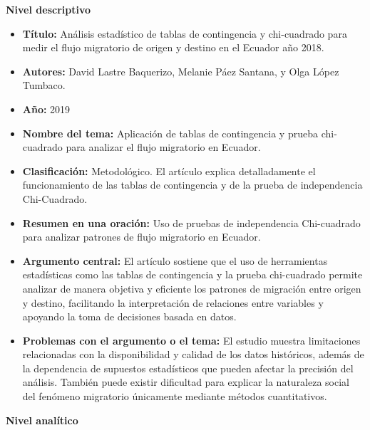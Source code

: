 \documentclass[12pt]{article}
\begin{document}
\textbf{Nivel descriptivo}
\begin{itemize}
    \item \textbf{Título:} Análisis estadístico de tablas de contingencia y chi-cuadrado para medir el flujo migratorio de
    origen y destino en el Ecuador año 2018.
    
    \item \textbf{Autores:}  David Lastre Baquerizo, Melanie Páez Santana, y Olga López Tumbaco.
    
    \item \textbf{Año:} 2019
    
    \item \textbf{Nombre del tema:} Aplicación de tablas de contingencia y prueba chi-cuadrado para analizar el flujo 
    migratorio en Ecuador.
    
    \item \textbf{Clasificación:} Metodológico. El artículo explica detalladamente el funcionamiento de las tablas de contingencia y de 
    la prueba de independencia Chi-Cuadrado.
    
    \item \textbf{Resumen en una oración:} Uso de pruebas de independencia Chi-cuadrado para analizar patrones de flujo migratorio en Ecuador.
    
    \item \textbf{Argumento central:} El artículo sostiene que el uso de herramientas estadísticas como las tablas de contingencia y la prueba 
    chi-cuadrado permite analizar de manera objetiva y eficiente los patrones de migración entre origen y destino, facilitando la interpretación 
    de relaciones entre variables y apoyando la toma de decisiones basada en datos.
    
    \item \textbf{Problemas con el argumento o el tema:} El estudio muestra limitaciones relacionadas con la disponibilidad y calidad de los datos 
    históricos, además de la dependencia de supuestos estadísticos que pueden afectar la precisión del análisis. También puede existir dificultad para 
    explicar la naturaleza social del fenómeno migratorio únicamente mediante métodos cuantitativos.\\
\end{itemize}


\textbf{Nivel analítico}
\end{document}

